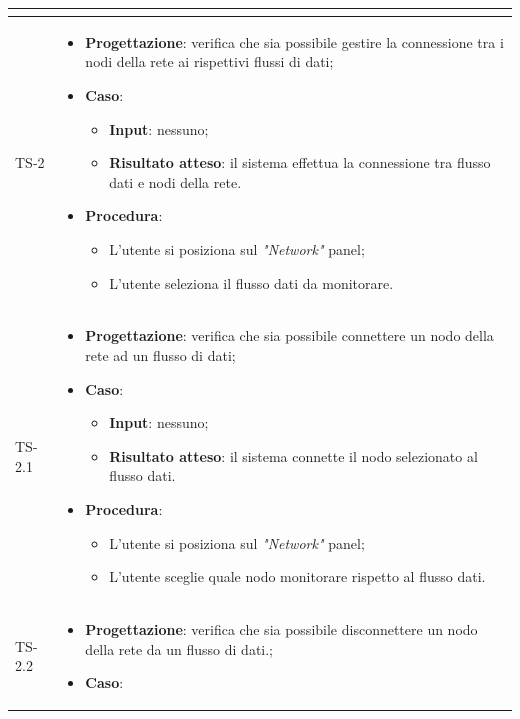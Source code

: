 \begin{longtable}{|C{2.5cm}|C{13cm}|}
\begin{itemize}
\begin{itemize}
	\end{itemize} 
\end{itemize}\\
	\hline
	{TS-2} & 
\begin{itemize}
	\item \textbf{Progettazione}: verifica che sia possibile gestire la
	connessione tra i nodi della rete ai rispettivi flussi di dati;
	\item \textbf{Caso}: 
	\begin{itemize}
		\item \textbf{Input}: nessuno;
		\item \textbf{Risultato atteso}: il sistema effettua la connessione tra flusso dati e nodi della rete.
	\end{itemize}
	\item \textbf{Procedura}:
	\begin{itemize}
		\item L'utente si posiziona sul \emph{"Network"} panel;
		\item L'utente seleziona il flusso dati da monitorare.
	\end{itemize} 
\end{itemize} \\
	\hline
	{TS-2.1} &
\begin{itemize}
	\item \textbf{Progettazione}: verifica che sia possibile connettere un
	nodo della rete ad un flusso di dati;
	\item \textbf{Caso}: 
	\begin{itemize}
		\item \textbf{Input}: nessuno;
		\item \textbf{Risultato atteso}: il sistema connette il nodo selezionato al flusso dati.
	\end{itemize}
	\item \textbf{Procedura}:
	\begin{itemize}
		\item L'utente si posiziona sul \emph{"Network"} panel;
		\item L'utente sceglie quale nodo monitorare rispetto al flusso dati.
	\end{itemize} 
\end{itemize}	
	 \\
	\hline
	{TS-2.2} &
\begin{itemize}
	\item \textbf{Progettazione}: verifica che sia possibile disconnettere un
	nodo della rete da un flusso di dati.;
	\item \textbf{Caso}: 

\end{itemize}
\end{longtable}
